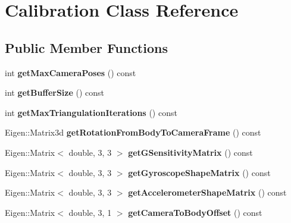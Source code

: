 \hypertarget{class_calibration}{\section{Calibration Class Reference}
\label{class_calibration}
}
\subsection*{Public Member Functions}
\begin{DoxyCompactItemize}
\item 
\hypertarget{class_calibration_a0273a577bae64d0833262103580e4a38}{int {\bfseries get\-Max\-Camera\-Poses} () const }\label{class_calibration_a0273a577bae64d0833262103580e4a38}

\item 
\hypertarget{class_calibration_acdf5d45d605b29f9114ae05600f07b76}{int {\bfseries get\-Buffer\-Size} () const }\label{class_calibration_acdf5d45d605b29f9114ae05600f07b76}

\item 
\hypertarget{class_calibration_a681582420d47807e4d8b1c8608e35aef}{int {\bfseries get\-Max\-Triangulation\-Iterations} () const }\label{class_calibration_a681582420d47807e4d8b1c8608e35aef}

\item 
\hypertarget{class_calibration_a871a481190b4ac5a4bb3ae1d5426726e}{Eigen\-::\-Matrix3d {\bfseries get\-Rotation\-From\-Body\-To\-Camera\-Frame} () const }\label{class_calibration_a871a481190b4ac5a4bb3ae1d5426726e}

\item 
\hypertarget{class_calibration_ad3edc4101a92835c6eed1dcfa004b592}{Eigen\-::\-Matrix$<$ double, 3, 3 $>$ {\bfseries get\-G\-Sensitivity\-Matrix} () const }\label{class_calibration_ad3edc4101a92835c6eed1dcfa004b592}

\item 
\hypertarget{class_calibration_a645b1a1cd460d493756669392ac71b78}{Eigen\-::\-Matrix$<$ double, 3, 3 $>$ {\bfseries get\-Gyroscope\-Shape\-Matrix} () const }\label{class_calibration_a645b1a1cd460d493756669392ac71b78}

\item 
\hypertarget{class_calibration_acd1d1fff6512b6fbfa8ff80cd45033f3}{Eigen\-::\-Matrix$<$ double, 3, 3 $>$ {\bfseries get\-Accelerometer\-Shape\-Matrix} () const }\label{class_calibration_acd1d1fff6512b6fbfa8ff80cd45033f3}

\item 
\hypertarget{class_calibration_a1144bc436545a52c5036ba6b02028c78}{Eigen\-::\-Matrix$<$ double, 3, 1 $>$ {\bfseries get\-Camera\-To\-Body\-Offset} () const }\label{class_calibration_a1144bc436545a52c5036ba6b02028c78}


\end{DoxyCompactItemize}
